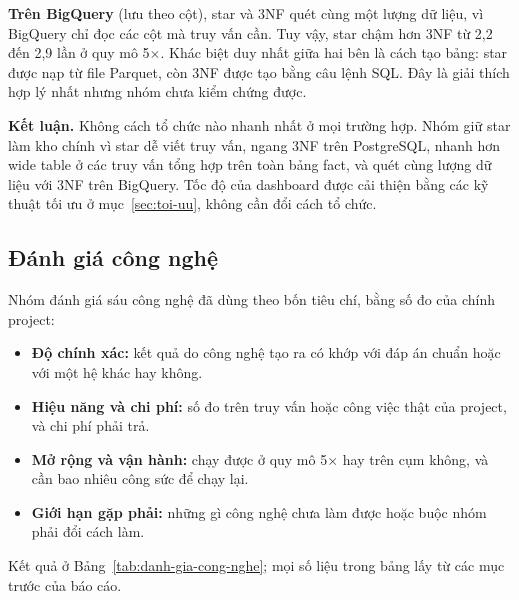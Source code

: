 \textbf{Trên BigQuery} (lưu theo cột), star và 3NF quét cùng một lượng dữ liệu, vì BigQuery chỉ đọc
các cột mà truy vấn cần. Tuy vậy, star chậm hơn 3NF từ 2,2 đến 2,9 lần ở quy mô 5$\times$. Khác biệt
duy nhất giữa hai bên là cách tạo bảng: star được nạp từ file Parquet, còn 3NF được tạo bằng câu
lệnh SQL. Đây là giải thích hợp lý nhất nhưng nhóm chưa kiểm chứng được.

\textbf{Kết luận.} Không cách tổ chức nào nhanh nhất ở mọi trường hợp. Nhóm giữ star làm kho chính
vì star dễ viết truy vấn, ngang 3NF trên PostgreSQL, nhanh hơn wide table ở các truy vấn tổng hợp
trên toàn bảng fact, và quét cùng lượng dữ liệu với 3NF trên BigQuery. Tốc độ của dashboard được cải thiện bằng các
kỹ thuật tối ưu ở mục~\ref{sec:toi-uu}, không cần đổi cách tổ chức.

\subsection{Đánh giá công nghệ}
\label{sec:danh-gia-cong-nghe}

Nhóm đánh giá sáu công nghệ đã dùng theo bốn tiêu chí, bằng số đo của chính project:

\begin{itemize}
  \item \textbf{Độ chính xác:} kết quả do công nghệ tạo ra có khớp với đáp án chuẩn hoặc với một hệ
        khác hay không.
  \item \textbf{Hiệu năng và chi phí:} số đo trên truy vấn hoặc công việc thật của project, và chi
        phí phải trả.
  \item \textbf{Mở rộng và vận hành:} chạy được ở quy mô 5$\times$ hay trên cụm không, và cần bao
        nhiêu công sức để chạy lại.
  \item \textbf{Giới hạn gặp phải:} những gì công nghệ chưa làm được hoặc buộc nhóm phải đổi cách làm.
\end{itemize}

Kết quả ở Bảng~\ref{tab:danh-gia-cong-nghe}; mọi số liệu trong bảng lấy từ các mục trước của báo cáo.

